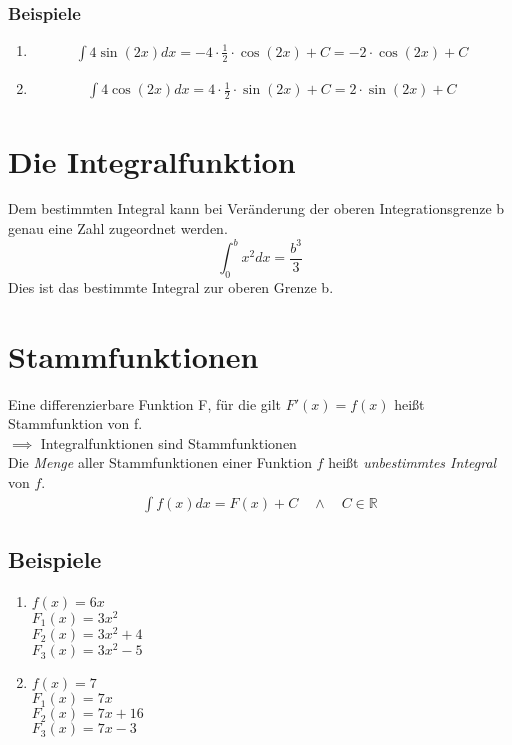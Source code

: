 \documentclass[12pt, a4paper]{report}
\begin{document}
\subsubsection{Beispiele}
\begin{fleqn}[\parindent]
\begin{enumerate}
\item
\begin{align*}
\int 4\sin(2x)dx = -4\cdot \frac{1}{2} \cdot \cos(2x) + C =-2 \cdot \cos(2x) + C
\end{align*}
\item
\begin{align*}
\int 4\cos(2x)dx = 4\cdot \frac{1}{2} \cdot \sin(2x) + C =2 \cdot \sin(2x) + C
\end{align*}
\end{enumerate}
\end{fleqn}

\section{Die Integralfunktion}
Dem bestimmten Integral kann bei Veränderung der oberen Integrationsgrenze b genau eine Zahl zugeordnet werden.
\begin{equation}
\int_0^b x^2 dx=\frac{b^3}{3}
\end{equation}
Dies ist das bestimmte Integral zur oberen Grenze b.


\section{Stammfunktionen}
Eine differenzierbare Funktion F, für die gilt $F'(x)=f(x)$ heißt Stammfunktion von f. \\
$\implies$ Integralfunktionen sind Stammfunktionen\\
Die \emph{Menge} aller Stammfunktionen einer Funktion $f$ heißt \emph{unbestimmtes Integral} von $f$.\\

\begin{equation}
\begin{aligned}
\int f(x) dx=F(x)+C \quad \land \quad C\in \mathbb{R}
\end{aligned}
\end{equation}

\subsection{Beispiele}
\begin{enumerate}
\item $f(x)=6x$\\
$F_1(x)=3x^2$\\
$F_2(x)=3x^2+4$\\
$F_3(x)=3x^2-5$
\item $f(x)=7$\\
$F_1(x)=7x$\\
$F_2(x)=7x+16$\\
$F_3(x)=7x-3$
\end{enumerate}
\end{document}
